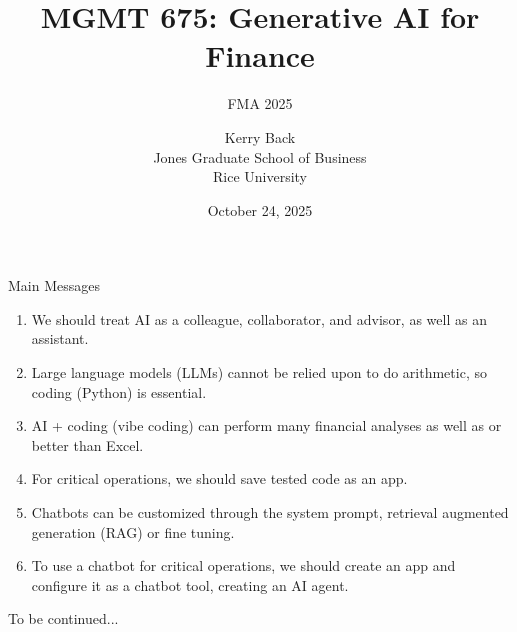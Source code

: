 \documentclass[10pt]{beamer}
\title{MGMT 675: Generative AI for Finance}
\subtitle{FMA 2025}
\date{October 24, 2025}
\author{Kerry Back\\ 
Jones Graduate School of Business\\
Rice University}
\begin{document}
\maketitle

\begin{frame}{Main Messages}
    \begin{enumerate}
    \item We should treat AI as a colleague, collaborator, and advisor, as well as an assistant. 
\item Large language models (LLMs) cannot be relied upon to do arithmetic, so coding (Python) is essential.  
\item AI + coding (vibe coding) can perform many financial analyses as well as or better than Excel.
\item For critical operations, we should save tested code as an app.
\item Chatbots can be customized through the system prompt, retrieval augmented generation (RAG) or fine tuning.
\item To use a chatbot for critical operations, we should create an app and configure it as a chatbot tool, creating an AI agent.
    \end{enumerate}
\end{frame}

\begin{frame}
To be continued...
\end{frame}
\end{document}
